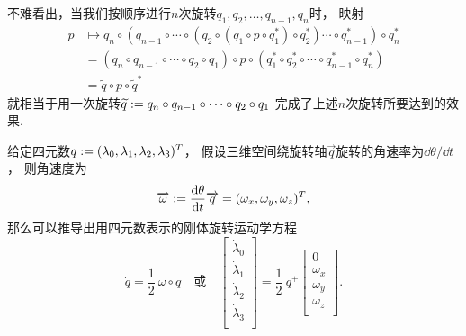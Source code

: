 不难看出，当我们按顺序进行\(n\)次旋转\(q_1,q_2,\dotsc,q_{n-1},q_n\)时，
映射\begin{align*}
	p
	&\mapsto
	q_n \circ (q_{n-1} \circ \dotsm \circ (q_2 \circ (q_1 \circ p \circ q_1^*) \circ q_2^*) \dotsm \circ q_{n-1}^*) \circ q_n^*
	\\
	&=
	(q_n \circ q_{n-1} \circ \dotsm \circ q_2 \circ q_1) \circ p \circ (q_1^* \circ q_2^* \circ \dotsm \circ q_{n-1}^* \circ q_n^*)
	\\
	&= \widetilde{q} \circ p \circ \widetilde{q}^*
\end{align*}
就相当于用一次旋转\(\widetilde{q} := q_n \circ q_{n-1} \circ \dotsm \circ q_2 \circ q_1\)
完成了上述\(n\)次旋转所要达到的效果.

给定四元数\(q := (\lambda_0,\lambda_1,\lambda_2,\lambda_3)^T\)，
假设三维空间绕旋转轴\(\vec{q}\)旋转的角速率为\(\dd{\theta}/\dd{t}\)，
则角速度为\begin{equation*}
	\overrightarrow{\omega} := \dv{\theta}{t} \overrightarrow{q} = (\omega_x,\omega_y,\omega_z)^T,
\end{equation*}
那么可以推导出用四元数表示的刚体旋转运动学方程\begin{equation*}
	\dot{q}
	= \frac12 ~ \omega \circ q
	\quad\text{或}\quad
	\begin{bmatrix}
		\dot{\lambda}_0 \\
		\dot{\lambda}_1 \\
		\dot{\lambda}_2 \\
		\dot{\lambda}_3 \\
	\end{bmatrix}
	= \frac12 ~
	q^+
	\begin{bmatrix}
		0 \\
		\omega_x \\
		\omega_y \\
		\omega_z \\
	\end{bmatrix}.
\end{equation*}

